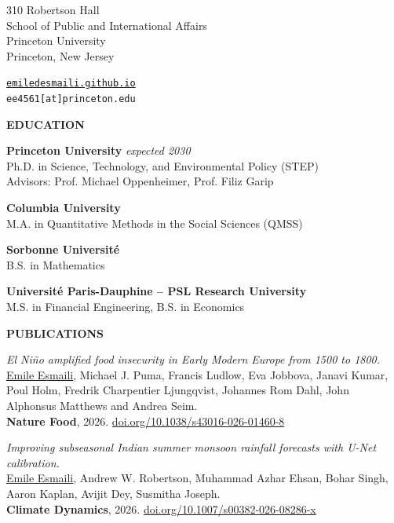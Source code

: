\documentclass{resume} %
\renewenvironment{rSection}[1]{%
\sectionskip
\noindent\begin{minipage}[t]{0.16\textwidth}
\raggedright\footnotesize\textbf{\MakeUppercase{#1}}
\end{minipage}%
\hspace{0.02\textwidth}%
\begin{minipage}[t]{0.82\textwidth}
\setlength{\parskip}{0.5\baselineskip}%
}{%
\end{minipage}\par
}
\begin{document}
\noindent
\begin{minipage}[t]{0.5\textwidth}
  \raggedright
  310 Robertson Hall\\
  School of Public and International Affairs\\
  Princeton University\\
  Princeton, New Jersey
\end{minipage}%
\begin{minipage}[t]{0.5\textwidth}
  \raggedleft
  \href{https://emiledesmaili.github.io}{\texttt{emiledesmaili.github.io}}\\
  \texttt{ee4561[at]princeton.edu}
\end{minipage}
\medskip

\begin{rSection}{Education}
{\bf Princeton University} \hfill {\em expected 2030} \\
Ph.D. in Science, Technology, and Environmental Policy (STEP) \\
Advisors: {Prof. Michael Oppenheimer}, {Prof. Filiz Garip}

{\bf Columbia University} \hfill {} \\
M.A. in Quantitative Methods in the Social Sciences  (QMSS)

{\bf Sorbonne Université} \hfill {} \\
B.S. in Mathematics

{\bf Université Paris-Dauphine -- PSL Research University} \hfill {} \\
M.S. in Financial Engineering, B.S. in Economics

\end{rSection}

\begin{rSection}{Publications}

\textcolor{CustomBlue}{\textit{El Ni\~no amplified food insecurity in Early Modern Europe from 1500 to 1800.}}\\
\underline{Emile Esmaili}, Michael J. Puma, Francis Ludlow, Eva Jobbova, Janavi Kumar, Poul Holm, Fredrik Charpentier Ljungqvist, Johannes Rom Dahl, John Alphonsus Matthews and Andrea Seim.\\
\textbf{Nature Food}, 2026. {\hypersetup{urlcolor=black}\href{https://doi.org/10.1038/s43016-026-01460-8}{doi.org/10.1038/s43016-026-01460-8}}

\textcolor{CustomBlue}{\textit{Improving subseasonal Indian summer monsoon rainfall forecasts with U-Net calibration.}}\\
\underline{Emile Esmaili}, Andrew W. Robertson, Muhammad Azhar Ehsan, Bohar Singh, Aaron Kaplan, Avijit Dey, Susmitha Joseph.\\
\textbf{Climate Dynamics}, 2026. {\hypersetup{urlcolor=black}\href{https://doi.org/10.1007/s00382-026-08286-x}{doi.org/10.1007/s00382-026-08286-x}}

\end{rSection}
\end{document}
